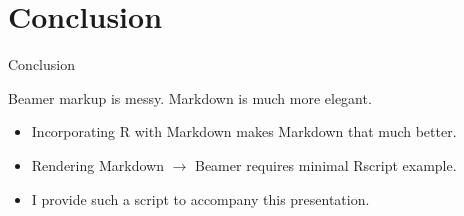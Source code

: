 \documentclass[10pt,ignorenonframetext,]{beamer}
\providecommand{\tightlist}{%
  \setlength{\itemsep}{0pt}\setlength{\parskip}{0pt}}
\begin{document}
\hypertarget{conclusion}{%
\section{Conclusion}\label{conclusion}}

\begin{frame}{Conclusion}
\protect\hypertarget{conclusion-1}{}

Beamer markup is messy. Markdown is much more elegant.

\begin{itemize}
\tightlist
\item
  Incorporating R with Markdown makes Markdown that much better.
\item
  Rendering Markdown \(\rightarrow\) Beamer requires minimal Rscript
  example.
\item
  I provide such a script to accompany this presentation.
\end{itemize}

\end{frame}
\end{document}

